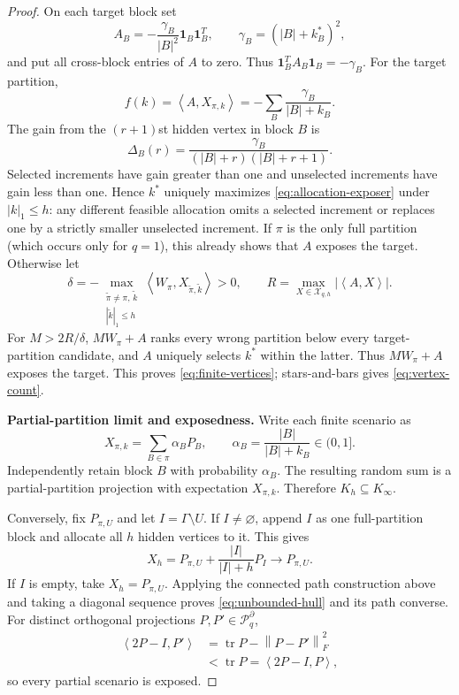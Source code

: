 \documentclass[journal,10pt]{IEEEtran}
\theoremstyle{definition}
\theoremstyle{remark}
\newcommand{\one}{\mathbf 1}
\newcommand{\tr}{\operatorname{tr}}
\newcommand{\cX}{\mathcal X}
\newcommand{\cP}{\mathcal P}
\newcommand{\ip}[2]{\left\langle #1,#2\right\rangle}
\newcommand{\norm}[1]{\left\lVert #1\right\rVert}
\begin{document}
\begin{proof}
On each target block set
\[
 A_B=-\frac{\gamma_B}{|B|^2}\one_B\one_B^T,
 \qquad \gamma_B=(|B|+k_B^*)^2,
\]
and put all cross-block entries of $A$ to zero.  Thus
$\one_B^TA_B\one_B=-\gamma_B$.
For the target partition,
\begin{equation}
  f(k)=\ip{A}{X_{\pi,k}}
      =-\sum_B\frac{\gamma_B}{|B|+k_B}.
  \label{eq:allocation-exposer}
\end{equation}
The gain from the $(r+1)$st hidden vertex in block $B$ is
\[
  \Delta_B(r)
  =\frac{\gamma_B}{(|B|+r)(|B|+r+1)}.
\]
Selected increments have gain greater than one and unselected increments have
gain less than one.  Hence $k^*$ uniquely maximizes
\eqref{eq:allocation-exposer} under $|k|_1\leq h$: any different feasible
allocation omits a selected increment or replaces one by a strictly smaller
unselected increment.  If $\pi$ is the only full partition (which occurs only
for $q=1$), this already shows that $A$ exposes the target.  Otherwise let
\[
 \delta=-\max_{\substack{\widetilde\pi\ne\pi,\,\widetilde k\\
                         |\widetilde k|_1\le h}}
          \ip{W_\pi}{X_{\widetilde\pi,\widetilde k}}>0,
 \qquad
 R=\max_{X\in\cX_{q,h}}|\ip{A}{X}|.
\]
For $M>2R/\delta$, $MW_\pi+A$ ranks every wrong partition below every
target-partition candidate, and $A$ uniquely selects $k^*$ within the latter.
Thus $MW_\pi+A$ exposes the target.  This proves
\eqref{eq:finite-vertices}; stars-and-bars gives
\eqref{eq:vertex-count}.

\textbf{Partial-partition limit and exposedness.}
Write each finite scenario as
\[
  X_{\pi,k}=\sum_{B\in\pi}\alpha_BP_B,
  \qquad \alpha_B=\frac{|B|}{|B|+k_B}\in(0,1].
\]
Independently retain block $B$ with probability $\alpha_B$.  The resulting
random sum is a partial-partition projection with expectation $X_{\pi,k}$.
Therefore $K_h\subseteq K_\infty$.

Conversely, fix $P_{\pi,U}$ and let $I=\Gamma\setminus U$.  If $I\neq
\varnothing$, append $I$ as one full-partition block and allocate all $h$
hidden vertices to it.  This gives
\begin{equation}
  X_h=P_{\pi,U}+\frac{|I|}{|I|+h}P_I\longrightarrow P_{\pi,U}.
  \label{eq:partial-approximation}
\end{equation}
If $I$ is empty, take $X_h=P_{\pi,U}$.  Applying the connected path
construction above and taking a diagonal sequence proves
\eqref{eq:unbounded-hull} and its path converse.  For distinct orthogonal
projections $P,P'\in\cP_q^\partial$,
\begin{equation}
\begin{aligned}
 \ip{2P-I}{P'}
 &=\tr P-\norm{P-P'}_F^2\\
 &<\tr P=\ip{2P-I}{P},
\end{aligned}
  \label{eq:partial-exposed}
\end{equation}
so every partial scenario is exposed.


\end{proof}
\end{document}
